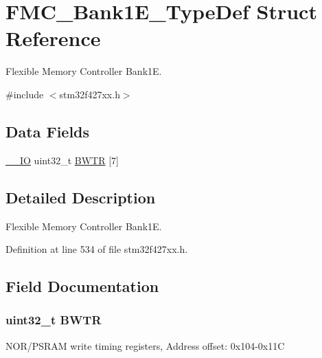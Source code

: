 \hypertarget{struct_f_m_c___bank1_e___type_def}{}\section{F\+M\+C\+\_\+\+Bank1\+E\+\_\+\+Type\+Def Struct Reference}
\label{struct_f_m_c___bank1_e___type_def}


Flexible Memory Controller Bank1E.  




{\ttfamily \#include $<$stm32f427xx.\+h$>$}

\subsection*{Data Fields}
\begin{DoxyCompactItemize}
\item 
\hyperlink{core__sc300_8h_aec43007d9998a0a0e01faede4133d6be}{\+\_\+\+\_\+\+IO} uint32\+\_\+t \hyperlink{struct_f_m_c___bank1_e___type_def_a1d1738f521b04c8dee773436ae6ac4a1}{B\+W\+TR} \mbox{[}7\mbox{]}
\end{DoxyCompactItemize}


\subsection{Detailed Description}
Flexible Memory Controller Bank1E. 

Definition at line 534 of file stm32f427xx.\+h.



\subsection{Field Documentation}
\subsubsection[{\texorpdfstring{B\+W\+TR}{BWTR}}]{ uint32\+\_\+t B\+W\+TR}\hypertarget{struct_f_m_c___bank1_e___type_def_a1d1738f521b04c8dee773436ae6ac4a1}{}\label{struct_f_m_c___bank1_e___type_def_a1d1738f521b04c8dee773436ae6ac4a1}
N\+O\+R/\+P\+S\+R\+AM write timing registers, Address offset\+: 0x104-\/0x11C 

